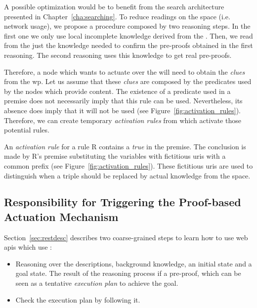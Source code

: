 \bigskip


A possible optimization would be to benefit from the search architecture presented in Chapter~\ref{cha:searching}.
To reduce readings on the space (i.e. network usage), we propose a procedure composed by two reasoning steps.
In the first one we only use local incomplete knowledge derived from the \clues{}.
Then, we read from the \Space{} just the knowledge needed to confirm the pre-proofs obtained in the first reasoning.
The second reasoning uses this knowledge to get real pre-proofs. %


Therefore, a node which wants to actuate over the \Space{} will need to obtain the \emph{clues} from the \ac{wp}.
Let us assume that these \emph{clues} are composed by the predicates used by the nodes which provide content. %
The existence of a predicate used in a premise does not necessarily imply that this rule can be used.
Nevertheless, its absence does imply that it will not be used (see Figure~\ref{fig:activation_rules}).
Therefore, we can create temporary \emph{activation rules} from \clues{} which activate those potential rules. %




An \emph{activation rule} for a rule R contains a \emph{true} in the premise.
The conclusion is made by R's premise substituting the variables with fictitious \acsp{uri} with a common prefix (see Figure~\ref{fig:activation_rules}).
These fictitious \acsp{uri} are used to distinguish when a triple should be replaced by actual knowledge from the space. %



\subsection{Responsibility for Triggering the Proof-based Actuation Mechanism}
\label{sec:responsible_proof}

Section~\ref{sec:restdesc} describes two coarse-grained steps to learn how to use web \acsp{api} which use \restdesc{}:
\begin{itemize}
  \item Reasoning over the descriptions, background knowledge, an initial state and a goal state.
        The result of the reasoning process if a pre-proof, which can be seen as a tentative \emph{execution plan} to achieve the goal.
  \item Check the execution plan by following it.
\end{itemize}


